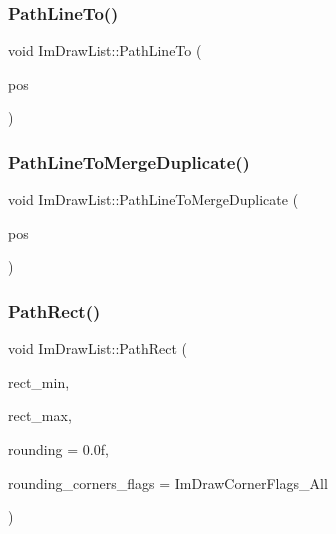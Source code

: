 \hypertarget{struct_im_draw_list_a828d944325ed58d8b57abd3647bffaaf}{}\label{struct_im_draw_list_a828d944325ed58d8b57abd3647bffaaf} 
\subsubsection{\texorpdfstring{Path\+Line\+To()}{PathLineTo()}}
{\footnotesize\ttfamily void Im\+Draw\+List\+::\+Path\+Line\+To (\begin{DoxyParamCaption}\item[{const \hyperlink{struct_im_vec2}{Im\+Vec2} \&}]{pos }\end{DoxyParamCaption})}

\hypertarget{struct_im_draw_list_aa3dd11945fb62495f8b9e1392ed724e3}{}\label{struct_im_draw_list_aa3dd11945fb62495f8b9e1392ed724e3} 
\subsubsection{\texorpdfstring{Path\+Line\+To\+Merge\+Duplicate()}{PathLineToMergeDuplicate()}}
{\footnotesize\ttfamily void Im\+Draw\+List\+::\+Path\+Line\+To\+Merge\+Duplicate (\begin{DoxyParamCaption}\item[{const \hyperlink{struct_im_vec2}{Im\+Vec2} \&}]{pos }\end{DoxyParamCaption})}

\hypertarget{struct_im_draw_list_a6664e5392e7cca67fd95c4dc0eae7569}{}\label{struct_im_draw_list_a6664e5392e7cca67fd95c4dc0eae7569} 
\subsubsection{\texorpdfstring{Path\+Rect()}{PathRect()}}
{\footnotesize\ttfamily void Im\+Draw\+List\+::\+Path\+Rect (\begin{DoxyParamCaption}\item[{const \hyperlink{struct_im_vec2}{Im\+Vec2} \&}]{rect\+\_\+min,  }\item[{const \hyperlink{struct_im_vec2}{Im\+Vec2} \&}]{rect\+\_\+max,  }\item[{float}]{rounding = {\ttfamily 0.0f},  }\item[{int}]{rounding\+\_\+corners\+\_\+flags = {\ttfamily ImDrawCornerFlags\+\_\+All} }\end{DoxyParamCaption})}

